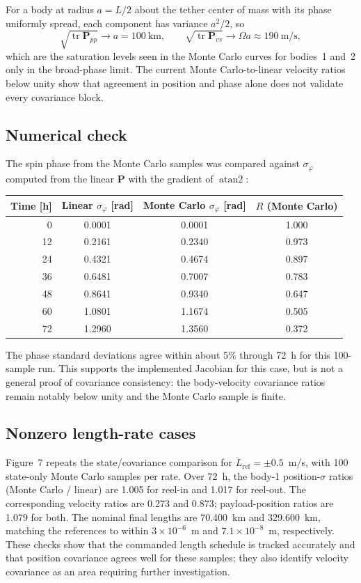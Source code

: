 \documentclass{article}
\newcommand{\Pm}{\mathbf{P}}
\begin{document}
For a body at radius $a = L/2$ about the tether center of mass with its phase
uniformly spread, each component has variance $a^2/2$, so
\begin{equation}
  \sqrt{\operatorname{tr}\Pm_{pp}} \to a = 100~\mathrm{km},
  \qquad
  \sqrt{\operatorname{tr}\Pm_{vv}} \to \Omega a \approx 190~\mathrm{m/s},
\end{equation}
which are the saturation levels seen in the Monte Carlo curves for bodies~1
and~2 only in the broad-phase limit. The current Monte Carlo-to-linear
velocity ratios below unity show that agreement in position and phase alone
does not validate every covariance block.

\subsection{Numerical check}

The spin phase from the Monte Carlo samples was compared against
$\sigma_\varphi$ computed from the linear $\Pm$ with the gradient of
$\operatorname{atan2}$:
\begin{center}
\begin{tabular}{rccc}
  \toprule
  Time [h] & Linear $\sigma_\varphi$ [rad] & Monte Carlo $\sigma_\varphi$ [rad] &
  $R$ (Monte Carlo) \\
  \midrule
   0 & 0.0001 & 0.0001 & 1.000 \\
  12 & 0.2161 & 0.2340 & 0.973 \\
  24 & 0.4321 & 0.4674 & 0.897 \\
  36 & 0.6481 & 0.7007 & 0.783 \\
  48 & 0.8641 & 0.9340 & 0.647 \\
  60 & 1.0801 & 1.1674 & 0.505 \\
  72 & 1.2960 & 1.3560 & 0.372 \\
  \bottomrule
\end{tabular}
\end{center}
The phase standard deviations agree within about 5\% through 72~h for this
100-sample run. This supports the implemented Jacobian for this case, but is
not a general proof of covariance consistency: the body-velocity covariance
ratios remain notably below unity and the Monte Carlo sample is finite.

\subsection{Nonzero length-rate cases}

Figure~7 repeats the state/covariance comparison for $\dot L_{\mathrm{ref}}=
\pm0.5$~m/s, with 100 state-only Monte Carlo samples per rate. Over 72~h, the
body-1 position-$\sigma$ ratios (Monte Carlo / linear) are 1.005 for reel-in
and 1.017 for reel-out. The corresponding velocity ratios are 0.273 and
0.873; payload-position ratios are 1.079 for both. The nominal final lengths
are 70.400~km and 329.600~km, matching the references to within
$3\times10^{-6}$~m and $7.1\times10^{-8}$~m, respectively. These checks show
that the commanded length schedule is tracked accurately and that position
covariance agrees well for these samples; they also identify velocity
covariance as an area requiring further investigation.
\end{document}
